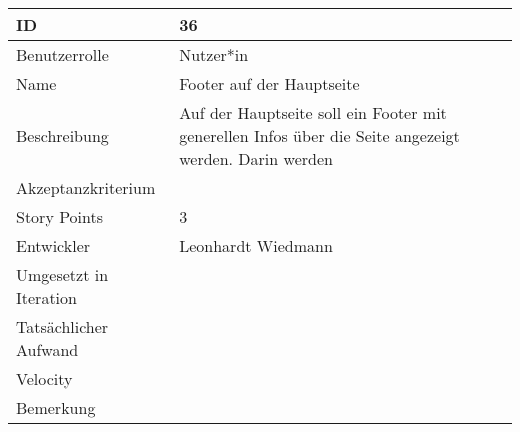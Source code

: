 \begin{tabularx}{\textwidth}{|p{}|X|}
	\hline
	ID & 36\\
	\hline
	Benutzerrolle & Nutzer*in\\
	\hline
	Name & Footer auf der Hauptseite\\
	\hline
	Beschreibung & Auf der Hauptseite soll ein Footer mit generellen Infos über die Seite angezeigt werden. Darin werden \\
	\hline
	Akzeptanzkriterium & \\
	\hline
	Story Points & 3\\
	\hline
	Entwickler & Leonhardt Wiedmann\\
	\hline
	Umgesetzt in Iteration & \\ 
	\hline
	Tatsächlicher Aufwand & \\
	\hline
	Velocity & \\
	\hline
	Bemerkung & \\
	\hline
\end{tabularx}
\vspace{20pt}
